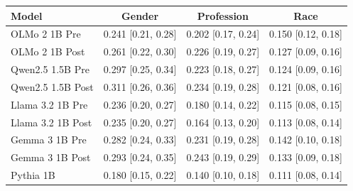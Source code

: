 \begin{tabular}{lccc}
\toprule
Model & Gender & Profession & Race \\
\midrule
OLMo 2 1B Pre & 0.241 [0.21, 0.28] & 0.202 [0.17, 0.24] & 0.150 [0.12, 0.18] \\
OLMo 2 1B Post & 0.261 [0.22, 0.30] & 0.226 [0.19, 0.27] & 0.127 [0.09, 0.16] \\
Qwen2.5 1.5B Pre & 0.297 [0.25, 0.34] & 0.223 [0.18, 0.27] & 0.124 [0.09, 0.16] \\
Qwen2.5 1.5B Post & 0.311 [0.26, 0.36] & 0.234 [0.19, 0.28] & 0.121 [0.08, 0.16] \\
Llama 3.2 1B Pre & 0.236 [0.20, 0.27] & 0.180 [0.14, 0.22] & 0.115 [0.08, 0.15] \\
Llama 3.2 1B Post & 0.235 [0.20, 0.27] & 0.164 [0.13, 0.20] & 0.113 [0.08, 0.14] \\
Gemma 3 1B Pre & 0.282 [0.24, 0.33] & 0.231 [0.19, 0.28] & 0.142 [0.10, 0.18] \\
Gemma 3 1B Post & 0.293 [0.24, 0.35] & 0.243 [0.19, 0.29] & 0.133 [0.09, 0.18] \\
Pythia 1B & 0.180 [0.15, 0.22] & 0.140 [0.10, 0.18] & 0.111 [0.08, 0.14] \\
\bottomrule
\end{tabular}
